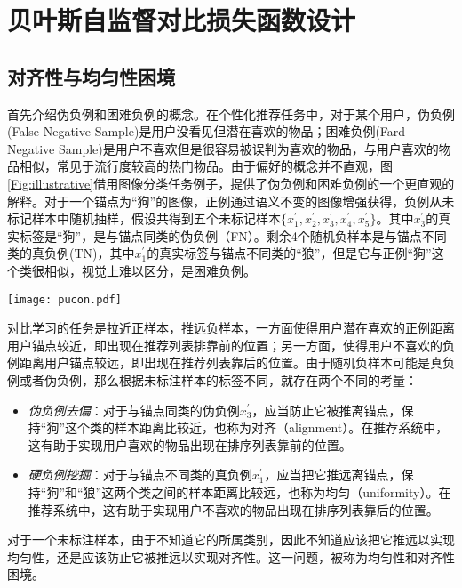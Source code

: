 \section{贝叶斯自监督对比损失函数设计}
\subsection{对齐性与均匀性困境}\label{subsec:fh}

首先介绍伪负例和困难负例的概念。在个性化推荐任务中，对于某个用户，伪负例(False Negative Sample)是用户没看见但潜在喜欢的物品；困难负例(Fard Negative Sample)是用户不喜欢但是很容易被误判为喜欢的物品，与用户喜欢的物品相似，常见于流行度较高的热门物品。由于偏好的概念并不直观，图\ref{Fig:illustrative}借用图像分类任务例子，提供了伪负例和困难负例的一个更直观的解释。对于一个锚点为“狗”的图像，正例通过语义不变的图像增强获得，负例从未标记样本中随机抽样，假设共得到五个未标记样本$\{x_1^\prime,x_2^\prime,x_3^\prime,x_4^\prime,x_5^\prime\}$。其中$x_3^\prime$的真实标签是“狗”，是与锚点同类的伪负例（FN）。剩余4个随机负样本是与锚点不同类的真负例(TN)，其中$x_1^\prime$的真实标签与锚点不同类的“狼”，但是它与正例“狗”这个类很相似，视觉上难以区分，是困难负例。

\begin{figure*}[!]
	\centering
	\texttt{[image: pucon.pdf]}
	\caption{自监督对比学习的伪负例去偏和硬负例挖掘示意图}
	\label{Fig:illustrative}
\end{figure*}

对比学习的任务是拉近正样本，推远负样本，一方面使得用户潜在喜欢的正例距离用户锚点较近，即出现在推荐列表排靠前的位置；另一方面，使得用户不喜欢的负例距离用户锚点较远，即出现在推荐列表靠后的位置。由于随机负样本可能是真负例或者伪负例，那么根据未标注样本的标签不同，就存在两个不同的考量：
\begin{itemize}
\item \textit{伪负例去偏}：对于与锚点同类的伪负例$x_3^\prime$，应当防止它被推离锚点，保持“狗”这个类的样本距离比较近，也称为对齐（alignment）。在推荐系统中，这有助于实现用户喜欢的物品出现在排序列表靠前的位置。
\item \textit{硬负例挖掘}：对于与锚点不同类的真负例$x_1^\prime$，应当把它推远离锚点，保持“狗”和“狼”这两个类之间的样本距离比较远，也称为均匀（uniformity）。在推荐系统中，这有助于实现用户不喜欢的物品出现在排序列表靠后的位置。
\end{itemize}
对于一个未标注样本，由于不知道它的所属类别，因此不知道应该把它推远以实现均匀性，还是应该防止它被推远以实现对齐性。这一问题，被称为均匀性和对齐性困境\cite{zhang:cl,Feng:2021:CVPR}。

